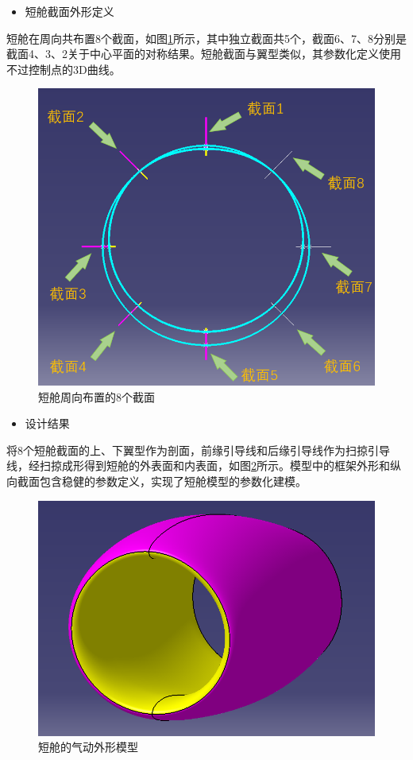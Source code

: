 \documentclass[12pt,a4paper]{report}
\begin{document}
\begin{itemize}
    \item[(2)] 短舱截面外形定义
\end{itemize}

短舱在周向共布置8个截面，如图\ref{fig:NacelleSections}所示，其中独立截面共5个，截面6、7、8分别是截面4、3、2关于中心平面的对称结果。短舱截面与翼型类似，其参数化定义使用不过控制点的3D曲线。

\begin{figure}[hbt!]
\centering
\includegraphics[width=.8\textwidth]{NacelleSections.PNG}
\caption{短舱周向布置的8个截面}
\label{fig:NacelleSections}
\end{figure}

\begin{itemize}
    \item[(3)] 设计结果
\end{itemize}

将8个短舱截面的上、下翼型作为剖面，前缘引导线和后缘引导线作为扫掠引导线，经扫掠成形得到短舱的外表面和内表面，如图\ref{fig:NacelleModel}所示。模型中的框架外形和纵向截面包含稳健的参数定义，实现了短舱模型的参数化建模。

\begin{figure}[hbt!]
\centering
\includegraphics[width=.8\textwidth]{NacelleModel.PNG}
\caption{短舱的气动外形模型}
\label{fig:NacelleModel}
\end{figure}
\end{document}
